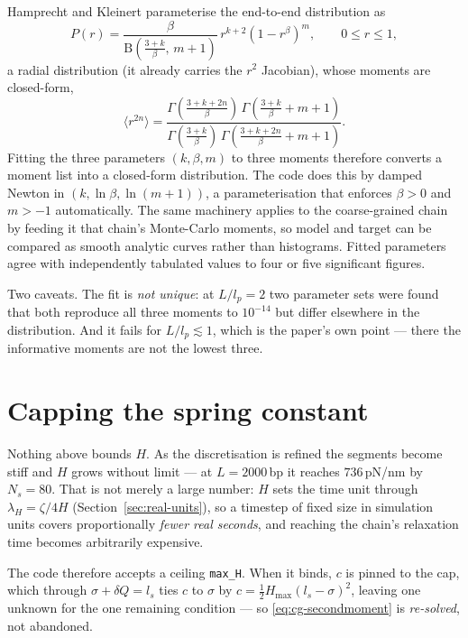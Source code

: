\documentclass[11pt,a4paper]{report}
\newcommand{\code}[1]{\texttt{\seqsplitcode{#1}}}
\newcommand{\seqsplitcode}[1]{#1}
\begin{document}
Hamprecht and Kleinert parameterise the end-to-end distribution as
\begin{equation}
  P(r) = \frac{\beta}{\mathrm{B}\!\left(\frac{3+k}{\beta},\,m+1\right)}\,
         r^{k+2}\left(1 - r^{\beta}\right)^{m},
  \qquad 0\le r\le 1,
  \label{eq:hk-pdf}
\end{equation}
a radial distribution (it already carries the $r^{2}$ Jacobian), whose moments are
closed-form,
\begin{equation}
  \langle r^{2n}\rangle =
    \frac{\Gamma\!\left(\frac{3+k+2n}{\beta}\right)\,
          \Gamma\!\left(\frac{3+k}{\beta}+m+1\right)}
         {\Gamma\!\left(\frac{3+k}{\beta}\right)\,
          \Gamma\!\left(\frac{3+k+2n}{\beta}+m+1\right)} .
  \label{eq:hk-moments}
\end{equation}
Fitting the three parameters $(k,\beta,m)$ to three moments therefore converts a
moment list into a closed-form distribution. The code does this by damped Newton
in $(k, \ln\beta, \ln(m+1))$, a parameterisation that enforces $\beta>0$ and
$m>-1$ automatically. The same machinery applies to the coarse-grained chain by
feeding it that chain's Monte-Carlo moments, so model and target can be compared
as smooth analytic curves rather than histograms. Fitted parameters agree with
independently tabulated values to four or five significant figures.

Two caveats. The fit is \emph{not unique}: at $L/l_p = 2$ two parameter sets were
found that both reproduce all three moments to $10^{-14}$ but differ elsewhere in
the distribution. And it fails for $L/l_p\lesssim1$, which is the paper's own
point --- there the informative moments are not the lowest three.


\section{Capping the spring constant}
\label{sec:cg-hcap}

Nothing above bounds $H$. As the discretisation is refined the segments become
stiff and $H$ grows without limit --- at $L = 2000$\,bp it reaches
$736$\,pN/nm by $N_s = 80$. That is not merely a large number: $H$ sets the time
unit through $\lambda_H = \zeta/4H$ (Section~\ref{sec:real-units}), so a timestep
of fixed size in simulation units covers proportionally \emph{fewer real seconds},
and reaching the chain's relaxation time becomes arbitrarily expensive.

The code therefore accepts a ceiling \code{max\_H}. When it binds, $c$ is pinned to
the cap, which through $\sigma+\delta Q = l_s$ ties $c$ to $\sigma$ by
$c = \tfrac12 H_{\max}(l_s-\sigma)^2$, leaving one unknown for the one remaining
condition --- so \eqref{eq:cg-secondmoment} is \emph{re-solved}, not abandoned.
\end{document}
